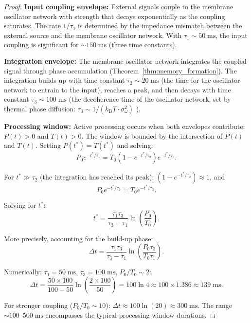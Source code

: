 \documentclass[twocolumn,10pt]{article}
\theoremstyle{remark}
\newcommand{\kB}{k_{\mathrm{B}}}
\begin{document}
\begin{proof}
\textbf{Input coupling envelope:} External signals couple to the membrane oscillator network with strength that decays exponentially as the coupling saturates. The rate $1/\tau_1$ is determined by the impedance mismatch between the external source and the membrane oscillator network. With $\tau_1 \sim 50\;\mathrm{ms}$, the input coupling is significant for $\sim 150\;\mathrm{ms}$ (three time constants).

\textbf{Integration envelope:} The membrane oscillator network integrates the coupled signal through phase accumulation (Theorem~\ref{thm:memory_formation}). The integration builds up with time constant $\tau_2 \sim 20\;\mathrm{ms}$ (the time for the oscillator network to entrain to the input), reaches a peak, and then decays with time constant $\tau_3 \sim 100\;\mathrm{ms}$ (the decoherence time of the oscillator network, set by thermal phase diffusion: $\tau_3 \sim 1/(\kB T \cdot \sigma_\omega^2)$ \cite{kuramoto1984}).

\textbf{Processing window:} Active processing occurs when both envelopes contribute: $P(t) > 0$ and $T(t) > 0$. The window is bounded by the intersection of $P(t)$ and $T(t)$. Setting $P(t^*) = T(t^*)$ and solving:
\begin{equation}
P_0 e^{-t^*/\tau_1} = T_0 (1 - e^{-t^*/\tau_2}) e^{-t^*/\tau_3}.
\end{equation}

For $t^* \gg \tau_2$ (the integration has reached its peak): $(1 - e^{-t^*/\tau_2}) \approx 1$, and
\begin{equation}
P_0 e^{-t^*/\tau_1} = T_0 e^{-t^*/\tau_3}.
\end{equation}

Solving for $t^*$:
\begin{equation}
t^* = \frac{\tau_1 \tau_3}{\tau_3 - \tau_1} \ln\!\left(\frac{P_0}{T_0}\right).
\end{equation}

More precisely, accounting for the build-up phase:
\begin{equation}
\Delta t = \frac{\tau_1 \tau_3}{\tau_3 - \tau_1} \ln\!\left(\frac{P_0 \tau_3}{T_0 \tau_1}\right).
\end{equation}

Numerically: $\tau_1 = 50\;\mathrm{ms}$, $\tau_3 = 100\;\mathrm{ms}$, $P_0/T_0 \sim 2$:
\begin{equation}
\Delta t = \frac{50 \times 100}{100 - 50} \ln\!\left(\frac{2 \times 100}{50}\right) = 100 \ln 4 \approx 100 \times 1.386 \approx 139\;\mathrm{ms}.
\end{equation}

For stronger coupling ($P_0/T_0 \sim 10$): $\Delta t \approx 100 \ln(20) \approx 300\;\mathrm{ms}$. The range $\sim 100$--$500\;\mathrm{ms}$ encompasses the typical processing window durations.
\end{proof}
\end{document}
